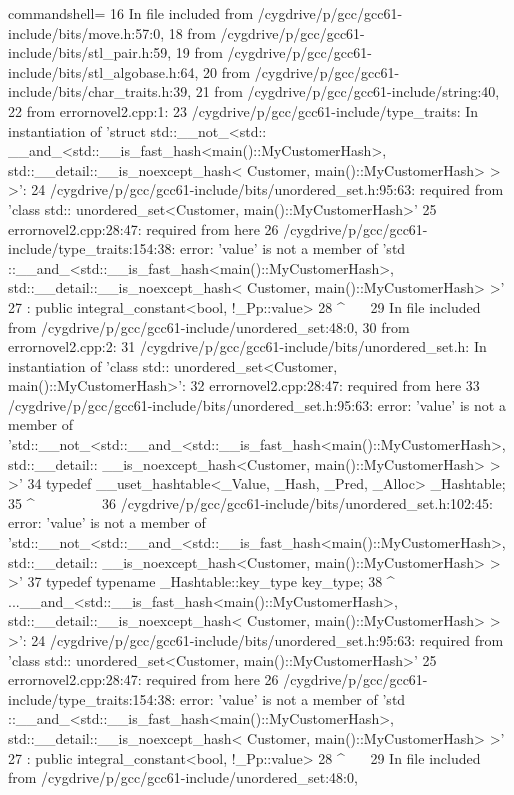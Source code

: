 \begin{tcblisting}{commandshell={}}
16 In file included from /cygdrive/p/gcc/gcc61-include/bits/move.h:57:0,
18 from /cygdrive/p/gcc/gcc61-include/bits/stl_pair.h:59,
19 from /cygdrive/p/gcc/gcc61-include/bits/stl_algobase.h:64,
20 from /cygdrive/p/gcc/gcc61-include/bits/char_traits.h:39,
21 from /cygdrive/p/gcc/gcc61-include/string:40,
22 from errornovel2.cpp:1:
23 /cygdrive/p/gcc/gcc61-include/type_traits: In instantiation of ’struct std::__not_<std::
__and_<std::__is_fast_hash<main()::MyCustomerHash>, std::__detail::__is_noexcept_hash<
Customer, main()::MyCustomerHash> > >’:
24 /cygdrive/p/gcc/gcc61-include/bits/unordered_set.h:95:63: required from ’class std::
unordered_set<Customer, main()::MyCustomerHash>’
25 errornovel2.cpp:28:47: required from here
26 /cygdrive/p/gcc/gcc61-include/type_traits:154:38: error: ’value’ is not a member of ’std
::__and_<std::__is_fast_hash<main()::MyCustomerHash>, std::__detail::__is_noexcept_hash<
Customer, main()::MyCustomerHash> >’
27 : public integral_constant<bool, !_Pp::value>
28 ^~~~
29 In file included from /cygdrive/p/gcc/gcc61-include/unordered_set:48:0,
30 from errornovel2.cpp:2:
31 /cygdrive/p/gcc/gcc61-include/bits/unordered_set.h: In instantiation of ’class std::
unordered_set<Customer, main()::MyCustomerHash>’:
32 errornovel2.cpp:28:47: required from here
33 /cygdrive/p/gcc/gcc61-include/bits/unordered_set.h:95:63: error: ’value’ is not a member
of ’std::__not_<std::__and_<std::__is_fast_hash<main()::MyCustomerHash>, std::__detail::
__is_noexcept_hash<Customer, main()::MyCustomerHash> > >’
34 typedef __uset_hashtable<_Value, _Hash, _Pred, _Alloc> _Hashtable;
35 ^~~~~~~~~~
36 /cygdrive/p/gcc/gcc61-include/bits/unordered_set.h:102:45: error: ’value’ is not a member
of ’std::__not_<std::__and_<std::__is_fast_hash<main()::MyCustomerHash>, std::__detail::
__is_noexcept_hash<Customer, main()::MyCustomerHash> > >’
37 typedef typename _Hashtable::key_type key_type;
38 ^~~~~~~~
...__and_<std::__is_fast_hash<main()::MyCustomerHash>, std::__detail::__is_noexcept_hash<
Customer, main()::MyCustomerHash> > >’:
24 /cygdrive/p/gcc/gcc61-include/bits/unordered_set.h:95:63: required from ’class std::
unordered_set<Customer, main()::MyCustomerHash>’
25 errornovel2.cpp:28:47: required from here
26 /cygdrive/p/gcc/gcc61-include/type_traits:154:38: error: ’value’ is not a member of ’std
::__and_<std::__is_fast_hash<main()::MyCustomerHash>, std::__detail::__is_noexcept_hash<
Customer, main()::MyCustomerHash> >’
27 : public integral_constant<bool, !_Pp::value>
28 ^~~~
29 In file included from /cygdrive/p/gcc/gcc61-include/unordered_set:48:0,

\end{tcblisting}
